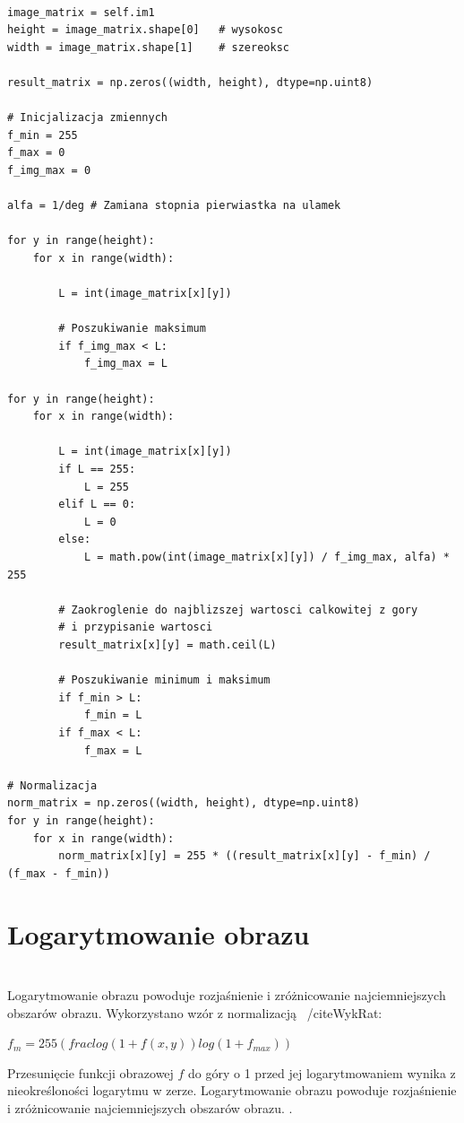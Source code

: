 \documentclass[final,a4paper,openany,12pt]{mwbk}
\begin{document}
\begin{lstlisting}[caption=Pierwiastkowanie obrazu szarego]

image_matrix = self.im1
height = image_matrix.shape[0]   # wysokosc
width = image_matrix.shape[1]    # szereoksc

result_matrix = np.zeros((width, height), dtype=np.uint8)

# Inicjalizacja zmiennych
f_min = 255
f_max = 0
f_img_max = 0

alfa = 1/deg # Zamiana stopnia pierwiastka na ulamek

for y in range(height):
    for x in range(width):  
        
        L = int(image_matrix[x][y])

        # Poszukiwanie maksimum
        if f_img_max < L:
            f_img_max = L

for y in range(height):
    for x in range(width):  
        
        L = int(image_matrix[x][y])
        if L == 255:
            L = 255
        elif L == 0:
            L = 0
        else:
            L = math.pow(int(image_matrix[x][y]) / f_img_max, alfa) * 255

        # Zaokroglenie do najblizszej wartosci calkowitej z gory
        # i przypisanie wartosci
        result_matrix[x][y] = math.ceil(L)

        # Poszukiwanie minimum i maksimum
        if f_min > L:
            f_min = L
        if f_max < L:
            f_max = L

# Normalizacja
norm_matrix = np.zeros((width, height), dtype=np.uint8)
for y in range(height):
    for x in range(width):
        norm_matrix[x][y] = 255 * ((result_matrix[x][y] - f_min) / (f_max - f_min))

\end{lstlisting}
\newpage

\section {Logarytmowanie obrazu}
\hfill\\
\indent
Logarytmowanie obrazu powoduje rozjaśnienie i zróżnicowanie najciemniejszych obszarów obrazu.
Wykorzystano wzór z normalizacją ~/cite{WykRat}:
	
	\begin{center}
		$f_{m} = 255(frac{log(1 + f(x,y))}{log(1 + f_{max})})$
	\end{center}

	
Przesunięcie funkcji obrazowej $f$ do góry o 1 przed jej logarytmowaniem wynika z nieokreśloności logarytmu w zerze. Logarytmowanie obrazu powoduje rozjaśnienie i zróżnicowanie najciemniejszych obszarów obrazu. .	
\end{document}
